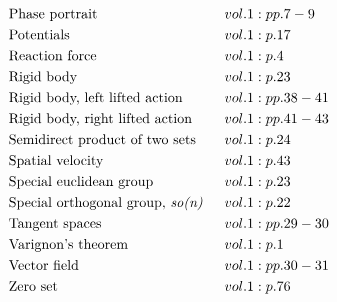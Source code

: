 \documentclass[a4paper]{article}
\begin{document}
\begin{align*}
&\text{Phase portrait} \hspace*{0.55556em}&& vol. 1: pp. 7-9\\
&\text{Potentials} \hspace*{0.55556em}&& vol. 1: p. 17\\
&\text{Reaction force} \hspace*{0.55556em}&& vol. 1: p. 4\\
&\text{Rigid body} \hspace*{0.55556em}&& vol. 1: p. 23\\
&\text{Rigid body, left lifted action} \hspace*{0.55556em}&& vol. 1: pp. 38-41\\
&\text{Rigid body, right lifted action} \hspace*{0.55556em}&& vol. 1: pp. 41-43\\
&\text{Semidirect product of two sets} \hspace*{0.55556em}&& vol. 1: p. 24\\
&\text{Spatial velocity} \hspace*{0.55556em}&& vol. 1: p. 43\\
&\text{Special euclidean group} \hspace*{0.55556em}&& vol. 1: p. 23\\
&\text{Special orthogonal group, \emph{so(n)}} \hspace*{0.55556em}&& vol. 1: p. 22\\
&\text{Tangent spaces} \hspace*{0.55556em}&& vol. 1: pp. 29-30\\
&\text{Varignon's theorem} \hspace*{0.55556em}&& vol. 1: p. 1\\
&\text{Vector field} \hspace*{0.55556em}&& vol. 1: pp. 30-31\\
&\text{Zero set} \hspace*{0.55556em}&& vol. 1: p. 76\\
\end{align*} 
\end{document}
